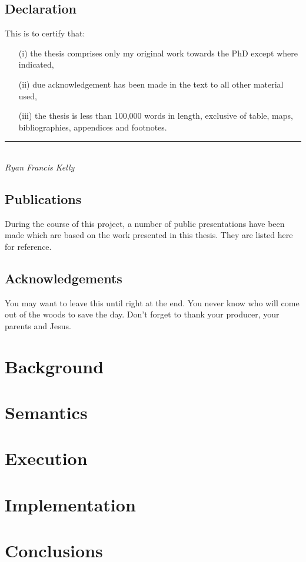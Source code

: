 \documentclass[a4paper,twoside,12pt]{book}
\begin{document}
\chapter*{Declaration}
This is to certify that:
\begin{itemize}
\item[(i)] the thesis comprises only my original work towards the PhD except where indicated,
\item[(ii)] due acknowledgement has been made in the text to all other material used,
\item[(iii)] the thesis is less than 100,000 words in length, exclusive of table, maps, bibliographies,
appendices and footnotes.
\end{itemize}
\vspace{3cm}
\rule{70mm}{0.1mm}\\
\emph{Ryan Francis Kelly}

\chapter*{Publications} %
During the course of this project, a number of public presentations have been made which are based on the work
presented in this thesis. They are listed here for reference.


\chapter*{Acknowledgements} %
You may want to leave this until right at the end. You never know who will come out of the woods to save the
day. Don't forget to thank your producer, your parents and Jesus.


\singlespace    %
\dominitoc
\tableofcontents
\listoftables   %
\listoffigures

\newpage
{}
\part{Background}

\singlespace

\part{Semantics}


\singlespace

\part{Execution}


\singlespace

\part{Implementation}

\singlespace

\part{Conclusions}

\singlespace






\end{document}
